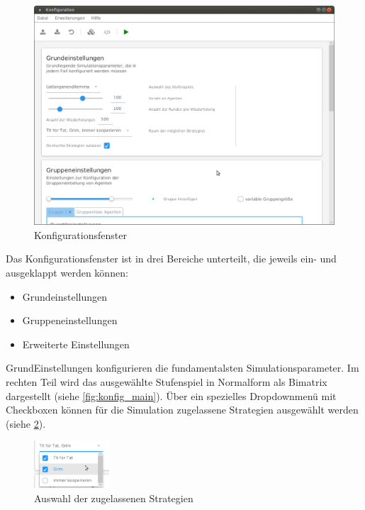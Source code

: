 \documentclass[parskip=full,11pt]{scrartcl}
\begin{document}
\begin{figure}[ht]
	\centering
	\includegraphics[width=\textwidth]{images/konfig.png}
	\caption{\label{fig:konfig}
		Konfigurationsfenster}
\end{figure} 

Das Konfigurationsfenster ist in drei Bereiche unterteilt, die jeweils ein- und ausgeklappt werden können:
\begin{itemize} \itemsep -10pt
	\item Grundeinstellungen
	\item Gruppeneinstellungen
	\item Erweiterte Einstellungen
\end{itemize}

GrundEinstellungen konfigurieren die fundamentalsten Simulationsparameter. Im rechten Teil wird das ausgewählte Stufenspiel in Normalform als Bimatrix dargestellt (siehe \cref{fig:konfig_main}). Über ein spezielles Dropdownmenü mit Checkboxen können für die Simulation zugelassene Strategien ausgewählt werden (siehe \cref{fig:konfig_strat_detail}).

\begin{figure}[ht]
	\centering
	\includegraphics[width=0.25\textwidth]{images/konfig_strat_detail.png}
	\caption{\label{fig:konfig_strat_detail}
		Auswahl der zugelassenen Strategien}
\end{figure}
\end{document}
